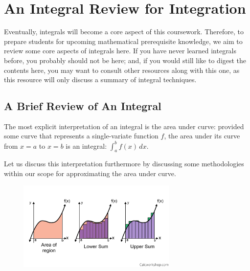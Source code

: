 \chapter{An Integral Review for Integration}
Eventually, integrals will become a core aspect of this coursework.
Therefore, to prepare students for upcoming mathematical prerequisite knowledge, we aim to review some core aspects of integrals here.
If you have never learned integrals before, you probably should not be here; and, if you would still like to digest the contents here, you may want to consult other resources along with this one, as this resource will only discuss a summary of integral techniques.

\section{A Brief Review of An Integral}
The most explicit interpretation of an integral is the area under curve: provided some curve that represents a single-variate function $f$, the area under its curve from $x = a$ to $x = b$ is an integral: $\int_a^b f(x) \,dx$.

Let us discuss this interpretation furthermore by discussing some methodologies within our scope for approximating the area under curve.
\begin{center}
    \begin{figure}
        \centering
        \includegraphics[width=0.7\textwidth]{figs/ln00/riemann-sums-area-distances.png}
    \end{figure}
\end{center}

